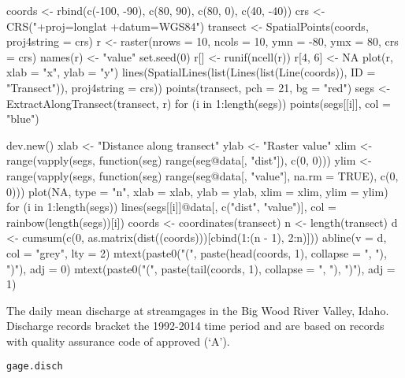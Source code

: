 \documentclass[a4paper]{book}
\begin{document}
\begin{Examples}
\begin{ExampleCode}
coords <- rbind(c(-100, -90), c(80, 90), c(80, 0), c(40, -40))
crs <- CRS("+proj=longlat +datum=WGS84")
transect <- SpatialPoints(coords, proj4string = crs)
r <- raster(nrows = 10, ncols = 10, ymn = -80, ymx = 80, crs = crs)
names(r) <- "value"
set.seed(0)
r[] <- runif(ncell(r))
r[4, 6] <- NA
plot(r, xlab = "x", ylab = "y")
lines(SpatialLines(list(Lines(list(Line(coords)), ID = "Transect")), proj4string = crs))
points(transect, pch = 21, bg = "red")
segs <- ExtractAlongTransect(transect, r)
for (i in 1:length(segs)) points(segs[[i]], col = "blue")

dev.new()
xlab <- "Distance along transect"
ylab <- "Raster value"
xlim <- range(vapply(segs, function(seg) range(seg@data[, "dist"]), c(0, 0)))
ylim <- range(vapply(segs, function(seg) range(seg@data[, "value"], na.rm = TRUE),
                     c(0, 0)))
plot(NA, type = "n", xlab = xlab, ylab = ylab, xlim = xlim, ylim = ylim)
for (i in 1:length(segs))
  lines(segs[[i]]@data[, c("dist", "value")], col = rainbow(length(segs))[i])
coords <- coordinates(transect)
n <- length(transect)
d <- cumsum(c(0, as.matrix(dist((coords)))[cbind(1:(n - 1), 2:n)]))
abline(v = d, col = "grey", lty = 2)
mtext(paste0("(", paste(head(coords, 1), collapse = ", "), ")"), adj = 0)
mtext(paste0("(", paste(tail(coords, 1), collapse = ", "), ")"), adj = 1)
\end{ExampleCode}
\end{Examples}
%
\begin{Description}\relax
The daily mean discharge at streamgages in the Big Wood River Valley, Idaho.
Discharge records bracket the 1992-2014 time period and are based on records with quality assurance code of approved (`A').
\end{Description}
%
\begin{Usage}
\begin{verbatim}
gage.disch
\end{verbatim}
\end{Usage}
%
\end{document}
